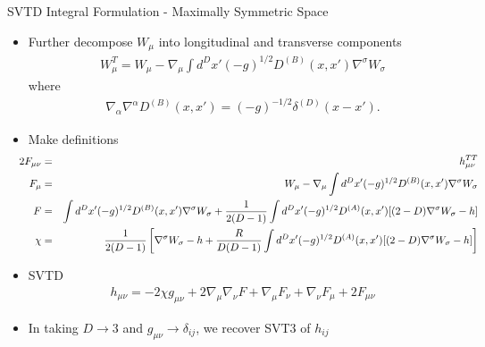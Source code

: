 \documentclass[8pt,aspectratio=1610]{beamer}
\begin{document}

\begin{frame}{SVTD Integral Formulation - Maximally Symmetric Space}
	\begin{itemize}
		\item Further decompose $W_{\mu}$ into longitudinal and transverse components
		\begin{eqnarray}
		W_\mu^T = W_\mu - \nabla_\mu \int d^Dx' (-g)^{1/2} D^{(B)}(x,x')\nabla^\sigma W_\sigma
		\end{eqnarray}
		where
		\begin{eqnarray}
		\nabla_\alpha\nabla^\alpha D^{(B)}(x,x') = (-g)^{-1/2}\delta^{(D)}(x-x').
		\end{eqnarray}
		\item Make definitions
	\begin{eqnarray}
	\hspace{-0.04\linewidth}2F_{\mu\nu} &=& h_{\mu\nu}^{TT}
	\nonumber\\
	F_\mu &=& W_\mu - \nabla_\mu\int d^Dx' (-g)^{1/2} D^{(B)}(x,x') \nabla^\sigma W_\sigma
	\nonumber\\
	F &=&  \int d^Dx' (-g)^{1/2} D^{(B)}(x,x')\nabla^\sigma W_\sigma + \frac{1}{2(D-1)}\int d^Dx' (-g)^{1/2} D^{(A)}(x,x')
	[(2-D)\nabla^\sigma W_\sigma -h]
	\nonumber\\ 
	\chi &=& \frac{1}{2(D-1)}\left[ \nabla^\sigma W_\sigma -h + \frac{R}{D(D-1)}\int d^Dx' (-g)^{1/2} D^{(A)}(x,x')[(2-D)\nabla^\sigma W_\sigma -h]\right]
	\end{eqnarray}
	\item SVTD
	\begin{eqnarray}
		h_{\mu\nu} = -2\chi g_{\mu\nu} + 2\nabla_\mu\nabla_\nu F + \nabla_\mu F_{\nu} + \nabla_\nu F_{\mu} + 2 F_{\mu\nu}
	\end{eqnarray}
	\item In taking $D\to 3$ and $g_{\mu\nu} \to \delta_{ij}$, we recover SVT3 of $h_{ij}$
	\end{itemize}
\end{frame}

\end{document}
